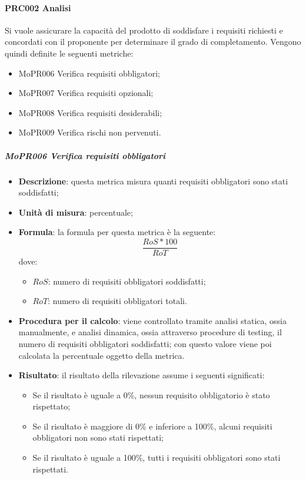 \documentclass[../norme-di-progetto.tex]{subfiles}
\begin{document}
\paragraph{PRC002 Analisi}
Si vuole assicurare la capacità del prodotto di soddisfare i requisiti richiesti e concordati con il proponente per determinare il grado di completamento. Vengono quindi definite le seguenti metriche:
\begin{itemize}
  \item MoPR006 Verifica requisiti obbligatori;
  \item MoPR007 Verifica requisiti opzionali;
  \item MoPR008 Verifica requisiti desiderabili;
  \item MoPR009 Verifica rischi non pervenuti.
\end{itemize}
\subparagraph{MoPR006 Verifica requisiti obbligatori}
\begin{itemize}
  \item \textbf{Descrizione}: questa metrica misura quanti requisiti obbligatori sono stati soddisfatti;
  \item \textbf{Unità di misura}: percentuale;
  \item \textbf{Formula}: la formula per questa metrica è la seguente:
  \begin{displaymath}
    \frac{RoS * 100}{RoT}
  \end{displaymath}
  dove:
  \begin{itemize}
    \item $ RoS $: numero di requisiti obbligatori soddisfatti;
    \item $ RoT $: numero di requisiti obbligatori totali.
  \end{itemize}
  \item \textbf{Procedura per il calcolo}: viene controllato tramite analisi statica, ossia manualmente, e analisi dinamica, ossia attraverso procedure di testing, il numero di requisiti obbligatori soddisfatti; con questo valore viene poi calcolata la percentuale oggetto della metrica.
  \item \textbf{Risultato}: il risultato della rilevazione assume i seguenti significati:
  \begin{itemize}
    \item Se il risultato è uguale a 0\%, nessun requisito obbligatorio è stato rispettato;
    \item Se il risultato è maggiore di 0\% e inferiore a 100\%, alcuni requisiti obbligatori non sono stati rispettati;
    \item Se il risultato è uguale a 100\%, tutti i requisiti obbligatori sono stati rispettati.
  \end{itemize}
\end{itemize}
\end{document}
